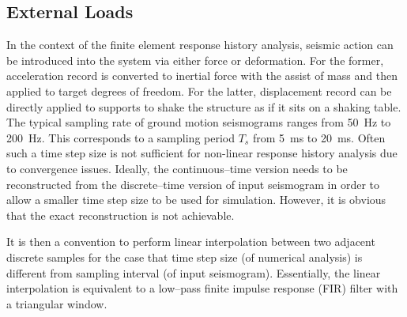 \subsection{External Loads}
In the context of the finite element response history analysis, seismic action can be introduced into the system via either force or deformation. For the former, acceleration record is converted to inertial force with the assist of mass and then applied to target degrees of freedom. For the latter, displacement record can be directly applied to supports to shake the structure as if it sits on a shaking table.
The typical sampling rate of ground motion seismograms ranges from \SI{50}{\hertz} to \SI{200}{\hertz}. This corresponds to a sampling period $T_s$ from \SI{5}{\milli\second} to \SI{20}{\milli\second}. Often such a time step size is not sufficient for non-linear response history analysis due to convergence issues. Ideally, the continuous--time version needs to be reconstructed from the discrete--time version of input seismogram in order to allow a smaller time step size to be used for simulation. However, it is obvious that the exact reconstruction is not achievable.

It is then a convention to perform linear interpolation between two adjacent discrete samples for the case that time step size (of numerical analysis) is different from sampling interval (of input seismogram). Essentially, the linear interpolation is equivalent to a low--pass finite impulse response (FIR) filter with a triangular window.

